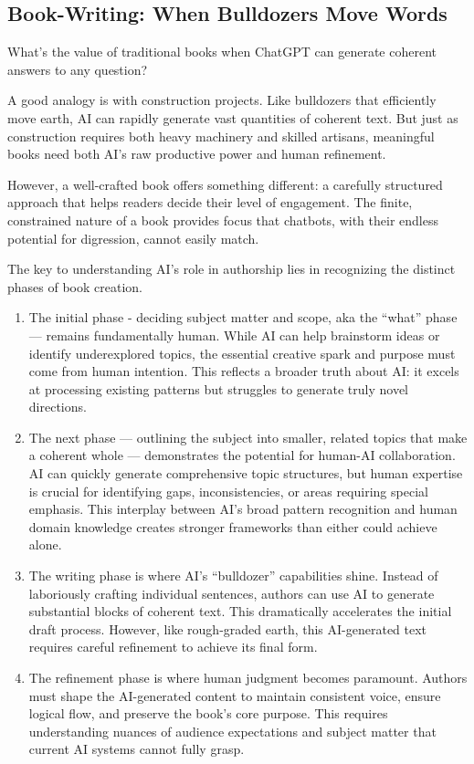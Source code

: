 \documentclass[
  Letterpaper,
]{scrbook}
\begin{document}
\subsection{Book-Writing: When Bulldozers Move
Words}\label{book-writing-when-bulldozers-move-words}

What's the value of traditional books when ChatGPT can generate coherent
answers to any question?

A good analogy is with construction projects. Like bulldozers that
efficiently move earth, AI can rapidly generate vast quantities of
coherent text. But just as construction requires both heavy machinery
and skilled artisans, meaningful books need both AI's raw productive
power and human refinement.

However, a well-crafted book offers something different: a carefully
structured approach that helps readers decide their level of engagement.
The finite, constrained nature of a book provides focus that chatbots,
with their endless potential for digression, cannot easily match.

The key to understanding AI's role in authorship lies in recognizing the
distinct phases of book creation.

\begin{enumerate}
\def\labelenumi{\arabic{enumi}.}
\item
  The initial phase - deciding subject matter and scope, aka the
  ``what'' phase --- remains fundamentally human. While AI can help
  brainstorm ideas or identify underexplored topics, the essential
  creative spark and purpose must come from human intention. This
  reflects a broader truth about AI: it excels at processing existing
  patterns but struggles to generate truly novel directions.
\item
  The next phase --- outlining the subject into smaller, related topics
  that make a coherent whole --- demonstrates the potential for human-AI
  collaboration. AI can quickly generate comprehensive topic structures,
  but human expertise is crucial for identifying gaps, inconsistencies,
  or areas requiring special emphasis. This interplay between AI's broad
  pattern recognition and human domain knowledge creates stronger
  frameworks than either could achieve alone.
\item
  The writing phase is where AI's ``bulldozer'' capabilities shine.
  Instead of laboriously crafting individual sentences, authors can use
  AI to generate substantial blocks of coherent text. This dramatically
  accelerates the initial draft process. However, like rough-graded
  earth, this AI-generated text requires careful refinement to achieve
  its final form.
\item
  The refinement phase is where human judgment becomes paramount.
  Authors must shape the AI-generated content to maintain consistent
  voice, ensure logical flow, and preserve the book's core purpose. This
  requires understanding nuances of audience expectations and subject
  matter that current AI systems cannot fully grasp.
\end{enumerate}
\end{document}
